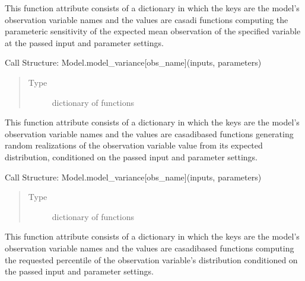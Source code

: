 \documentclass[letterpaper,10pt,english,openany,oneside]{sphinxmanual}
\begin{document}
\begin{fulllineitems}
\begin{fulllineitems}
\label{\detokenize{nloed:nloed.model.Model.model_sensitivity}}
This function attribute consists of a
dictionary in which the keys are the model’s observation variable names and the values
are casadi functions computing the parameteric sensitivity of the expected mean
observation of the specified variable at the passed input and parameter settings.

Call Structure: Model.model\_variance{[}obs\_name{]}(inputs, parameters)
\begin{quote}\begin{description}
\item[{Type}] \leavevmode
dictionary of functions

\end{description}\end{quote}

\end{fulllineitems}


\begin{fulllineitems}
\label{\detokenize{nloed:nloed.model.Model.observation_sampler}}
This function attribute consists of a
dictionary in which the keys are the model’s observation variable names and the values
are casadi\sphinxhyphen{}based functions generating random realizations of the observation variable value
from its expected distribution, conditioned on the passed input and parameter settings.

Call Structure: Model.model\_variance{[}obs\_name{]}(inputs, parameters)
\begin{quote}\begin{description}
\item[{Type}] \leavevmode
dictionary of functions

\end{description}\end{quote}

\end{fulllineitems}


\begin{fulllineitems}
\label{\detokenize{nloed:nloed.model.Model.observation_percentile}}
This function attribute consists of a
dictionary in which the keys are the model’s observation variable names and the values
are casadi\sphinxhyphen{}based functions computing the requested percentile of the observation variable’s
distribution conditioned on the passed input and parameter settings.


\end{fulllineitems}
\end{fulllineitems}
\end{document}
